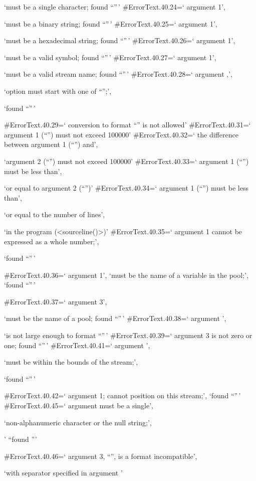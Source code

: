 `must be a single character; found ``''\,' \#ErrorText.40.24=` argument
1',

`must be a binary string; found ``''\,' \#ErrorText.40.25=` argument 1',

`must be a hexadecimal string; found ``''\,' \#ErrorText.40.26=`
argument 1',

`must be a valid symbol; found ``''\,' \#ErrorText.40.27=` argument 1',

`must be a valid stream name; found ``''\,' \#ErrorText.40.28=` argument
,',

`option must start with one of ``'';',

`found ``''\,'

\#ErrorText.40.29=` conversion to format ``'' is not allowed'
\#ErrorText.40.31=` argument 1 (``'') must not exceed 100000'
\#ErrorText.40.32=` the difference between argument 1 (``'') and',

`argument 2 (``'') must not exceed 100000' \#ErrorText.40.33=` argument
1 (``'') must be less than',

`or equal to argument 2 (``'')' \#ErrorText.40.34=` argument 1 (``'')
must be less than',

`or equal to the number of lines',

`in the program (\textless sourceline()\textgreater)'
\#ErrorText.40.35=` argument 1 cannot be expressed as a whole number;',

`found ``''\,'

\#ErrorText.40.36=` argument 1', `must be the name of a variable in the
pool;', `found ``''\,'

\#ErrorText.40.37=` argument 3',

`must be the name of a pool; found ``''\,' \#ErrorText.40.38=` argument
',

`is not large enough to format ``''\,' \#ErrorText.40.39=` argument 3 is
not zero or one; found ``''\,' \#ErrorText.40.41=` argument ',

`must be within the bounds of the stream;',

`found ``''\,'

\#ErrorText.40.42=` argument 1; cannot position on this stream;', `found
``''\,' \#ErrorText.40.45=` argument must be a single',

`non-alphanumeric character or the null string;',

' ``found '''

\#ErrorText.40.46=` argument 3, ``'', is a format incompatible',

`with separator specified in argument '

